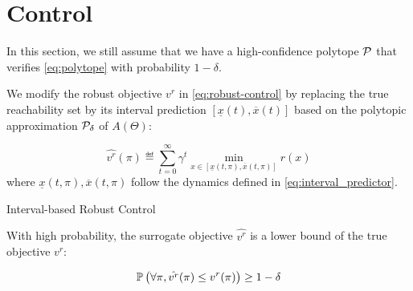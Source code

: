 \documentclass{article}
\begin{document}
\section{Control}

In this section, we still assume that we have a high-confidence polytope $\mathcal{P}$ that verifies \eqref{eq:polytope} with probability $1-\delta$.


\begin{definition}
We modify the robust objective $v^r$ in \eqref{eq:robust-control} by replacing the true reachability set by its interval prediction $[\underline{x}(t), \overline{x}(t)]$ based on the polytopic approximation $\mathcal{P}_\delta$ of $A(\Theta)$: 

\begin{equation}
\hat{v^r}(\pi) \eqdef \sum_{t=0}^\infty \gamma^t \min_{x\in[\underline{x}(t, \pi), \overline{x}(t, \pi)]}  r(x)
\end{equation}
where $\underline{x}(t, \pi), \overline{x}(t, \pi)$ follow the dynamics defined in \eqref{eq:interval_predictor}.
\end{definition}

\begin{algorithm}[tp]
  \SetAlgoLined\DontPrintSemicolon
  \setcounter{AlgoLine}{0}
\caption{Interval-based Robust Control}
\label{algo:irc}

\end{algorithm}

\begin{property}
\label{prop:lower-bound}
With high probability, the surrogate objective $\hat{v^r}$ is a lower bound of the true objective $v^r$:

\begin{equation}
\mathbb{P}\left(\forall \pi, \hat{v^r}(\pi) \leq v^r(\pi)\right) \geq 1-\delta
\end{equation}
\end{property}
\end{document}

